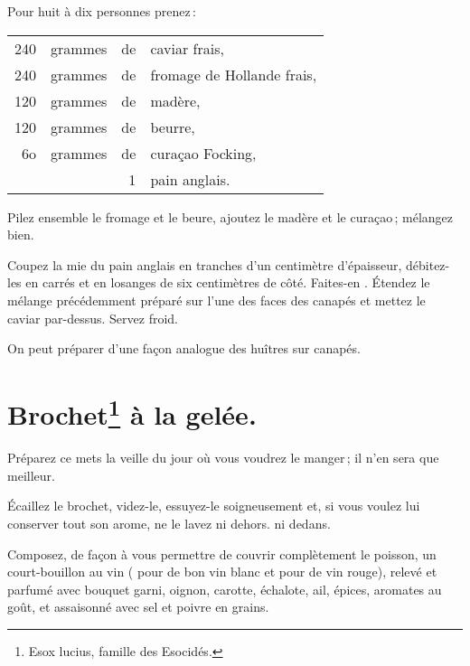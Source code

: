Pour huit à dix personnes prenez :

\footnotesize
\begin{longtable}{rrrp{16em}}
240 & grammes & de & caviar frais,                                                                       \\
240 & grammes & de & fromage de Hollande frais,                                                          \\
120 & grammes & de & madère,                                                                             \\
120 & grammes & de & beurre,                                                                             \\
 6o & grammes & de & curaçao Focking,                                                                    \\
    &         &  1 & pain anglais.                                                                       \\
\end{longtable}
\normalsize

Pilez ensemble le fromage et le beure, ajoutez le madère et le curaçao ;
mélangez bien.

Coupez la mie du pain anglais en tranches d'un centimètre d'épaisseur,
débitez-les en carrés et en losanges de six centimètres de côté. Faites-en
{\mmm}. Étendez le mélange précédemment préparé sur l'une des faces des
{\mmm} canapés et mettez le caviar par-dessus. Servez froid.

\sk

On peut préparer d’une façon analogue des huîtres sur canapés.

\section*{\centering Brochet\footnote{Esox lucius, famille des Esocidés.} à la gelée.}
{}

Préparez ce mets la veille du jour où vous voudrez le manger ; il n'en sera que
meilleur.

\label{pg0323} \hypertarget{p0323}{}
Écaillez le brochet, videz-le, essuyez-le soigneusement et, si vous voulez lui
conserver tout son arome, ne le lavez ni dehors. ni dedans.

Composez, de façon à vous permettre de couvrir complètement le poisson, un
court-bouillon au vin ({\mmm} pour {\mmm} de bon vin blanc et
{\mmm} pour {\mmm} de vin rouge), relevé et parfumé avec bouquet
garni, oignon, carotte, échalote, ail, épices, aromates au goût, et assaisonné
avec sel et poivre en grains.

